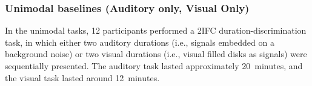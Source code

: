 \documentclass[9pt,lineno,doublespacing]{elife}
\begin{document}

\subsubsection{Unimodal baselines (Auditory only, Visual Only)}
In the unimodal tasks, 12 participants performed a 2IFC duration-discrimination task, in which  either two auditory durations (i.e., signals embedded on a background noise) or two visual durations (i.e., visual filled disks as signals) were sequentially presented. The auditory task lasted approximately 20~minutes, and the visual task lasted around 12~minutes. 
\end{document}

